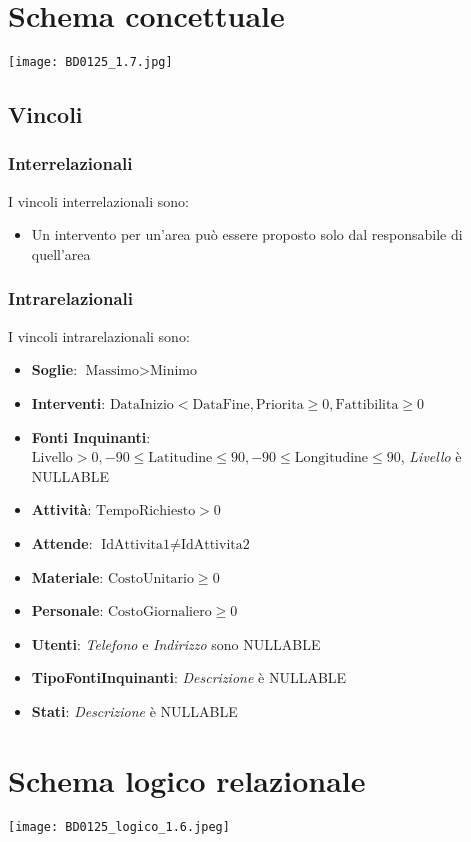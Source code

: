 \newpage
\section{Schema concettuale}
\begin{center}
	\texttt{[image: BD0125\_1.7.jpg]}
\end{center}

\subsection{Vincoli}
\subsubsection{Interrelazionali}
I vincoli interrelazionali sono:
\begin{itemize}
	\item Un intervento per un'area può essere proposto solo dal responsabile di quell'area
\end{itemize}
\subsubsection{Intrarelazionali}
I vincoli intrarelazionali sono:
\begin{itemize}
	\item \textbf{Soglie}: $\text{Massimo} > \text{Minimo}$
	\item \textbf{Interventi}: $\text{DataInizio} < \text{DataFine}, \text{Priorita}\geq0, \text{Fattibilita}\geq0$
	\item \textbf{Fonti Inquinanti}: $\text{Livello}>0, -90 \leq \text{Latitudine} \leq 90, -90 \leq \text{Longitudine}\leq90$, \textit{Livello} è NULLABLE
	\item \textbf{Attività}: $\text{TempoRichiesto}>0$
	\item \textbf{Attende}: $\text{IdAttivita1} \neq \text{IdAttivita2}$
	\item \textbf{Materiale}: $\text{CostoUnitario}\geq0$
	\item \textbf{Personale}: $\text{CostoGiornaliero}\geq0$
	\item \textbf{Utenti}: \textit{Telefono} e \textit{Indirizzo} sono NULLABLE
	\item \textbf{TipoFontiInquinanti}: \textit{Descrizione} è NULLABLE
	\item \textbf{Stati}: \textit{Descrizione} è NULLABLE
\end{itemize}

\section{Schema logico relazionale}
\begin{center}
	\texttt{[image: BD0125\_logico\_1.6.jpeg]}
\end{center}

